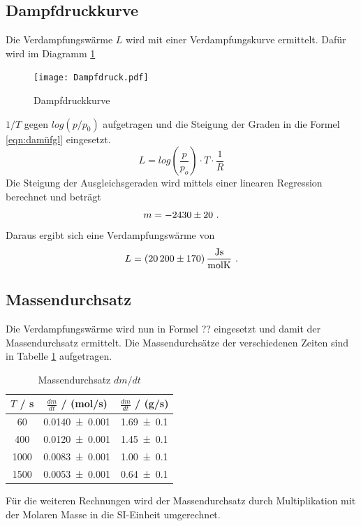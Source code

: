 \subsection{Dampfdruckkurve}
Die Verdampfungswärme $L$ wird mit einer Verdampfungskurve ermittelt. Dafür wird im Diagramm \ref{fig:dampfdruck}
\begin{figure}
  \centering
  \texttt{[image: Dampfdruck.pdf]}
  \caption{Dampfdruckkurve}
  \label{fig:dampfdruck}
\end{figure}
$1/T$ gegen $log(p/p_0)$ aufgetragen und die Steigung der Graden in die Formel \ref{eqn:damüfgl} eingesetzt.
\begin{equation}
  L = log \left( \frac{p}{p_o} \right) \cdot T \cdot \frac{1}{R}
  \label{eqn:dampfgl}
\end{equation}
Die Steigung der Ausgleichsgeraden wird mittels einer linearen Regression berechnet und beträgt
\begin{equation*}
  m = \num{-2430 +- 20} \ .
\end{equation*}
Daraus ergibt sich eine Verdampfungswärme von
\begin{equation}
  L = (\num{20200 +- 170}) \, \frac{\text{Js}}{\text{molK}} \ .
\end{equation}
\subsection{Massendurchsatz}
Die Verdampfungswärme wird nun in Formel ?? eingesetzt und damit der Massendurchsatz ermittelt. Die Massendurchsätze der verschiedenen Zeiten sind in Tabelle \ref{tab:dm/dt} aufgetragen.
\begin{table}
  \centering
  \begin{tabular}{c c c}
    \toprule
    $T$ / s & $\frac{dm}{dt}$ / (mol/s) & $\frac{dm}{dt}$ / (g/s) \\
    \midrule
    60   & \num{0.0140 +- 0.001} & \num{1.69 +- 0.1}\\
    400  & \num{0.0120 +- 0.001} & \num{1.45 +- 0.1}\\
    1000 & \num{0.0083 +- 0.001} & \num{1.00 +- 0.1}\\
    1500 & \num{0.0053 +- 0.001} & \num{0.64 +- 0.1}\\
    \bottomrule
  \end{tabular}
  \caption{Massendurchsatz $dm/dt$}
  \label{tab:dm/dt}
\end{table}
Für die weiteren Rechnungen wird der Massendurchsatz durch Multiplikation mit der Molaren Masse in die SI-Einheit umgerechnet.
